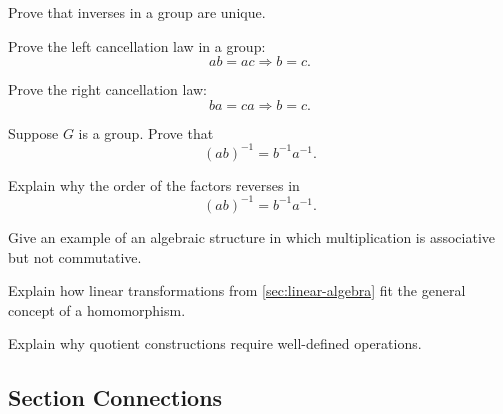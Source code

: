 \begin{exercise}[3]
Prove that inverses in a group are unique.
\end{exercise}

\begin{exercise}[3]
Prove the left cancellation law in a group:
\[ ab=ac\Longrightarrow b=c. \]
\end{exercise}

\begin{exercise}[3]
Prove the right cancellation law:
\[ ba=ca\Longrightarrow b=c. \]
\end{exercise}

\begin{exercise}[3]
Suppose \(G\) is a group. Prove that
\[ (ab)^{-1}=b^{-1}a^{-1}. \]
\end{exercise}

\begin{exercise}[3]
Explain why the order of the factors reverses in
\[ (ab)^{-1}=b^{-1}a^{-1}. \]
\end{exercise}

\begin{exercise}[3]
Give an example of an algebraic structure in which multiplication is
associative but not commutative.
\end{exercise}

\begin{exercise}[3]
Explain how linear transformations from \cref{sec:linear-algebra} fit the
general concept of a homomorphism.
\end{exercise}

\begin{exercise}[3]
Explain why quotient constructions require well-defined operations.
\end{exercise}

\subsection{Section Connections}
\label{subsec:abstract-algebra-connections}



